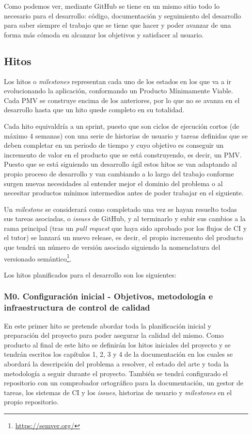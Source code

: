 Como podemos ver, mediante GitHub se tiene en un mismo sitio todo lo necesario para el desarrollo: código, documentación y seguimiento del desarrollo para saber siempre el trabajo que se tiene que hacer y poder avanzar de una forma más cómoda en alcanzar los objetivos y satisfacer al usuario. 

\subsection{Hitos}
Los hitos o \textit{milestones} representan cada uno de los estados en los que va a ir evolucionando la aplicación, conformando un Producto Mínimamente Viable. Cada PMV se construye encima de los anteriores, por lo que no se avanza en el desarrollo hasta que un hito quede completo en su totalidad. 

Cada hito equivaldría a un sprint, puesto que son ciclos de ejecución cortos (de máximo 4 semanas) con una serie de historias de usuario y tareas definidas que se deben completar en un periodo de tiempo y cuyo objetivo es conseguir un incremento de valor en el producto que se está construyendo, es decir, un PMV. Puesto que se está siguiendo un desarrollo ágil estos hitos se van adaptando al propio proceso de desarrollo y van cambiando a lo largo del trabajo conforme surgen nuevas necesidades al entender mejor el dominio del problema o al necesitar productos mínimos intermedios antes de poder trabajar en el siguiente.

Un \textit{milestone} se considerará como completado una vez se hayan resuelto todas sus tareas asociadas, o \textit{issues} de GitHub, y al terminarlo y subir sus cambios a la rama principal (tras un \textit{pull request} que haya sido aprobado por los flujos de CI y el tutor) se lanzará un nuevo release, es decir, el propio incremento del producto que tendrá un número de versión asociado siguiendo la nomenclatura del versionado semántico\footnote{\url{https://semver.org/}}.

Los hitos planificados para el desarrollo son los siguientes:

\subsubsection{M0. Configuración inicial - Objetivos, metodología e infraestructura de control de calidad}
En este primer hito se pretende abordar toda la planificación inicial y preparación del proyecto para poder asegurar la calidad del mismo. Como producto al final de este hito se definirán los hitos iniciales del proyecto y se tendrán escritos los capítulos 1, 2, 3 y 4 de la documentación en los cuales se abordará la descripción del problema a resolver, el estado del arte y toda la metodología a seguir durante el proyecto. También se tendrá configurado el repositorio con un comprobador ortográfico para la documentación, un gestor de tareas, los sistemas de CI y los \textit{issues}, historias de usuario y \textit{milestones} en el propio repositorio.

